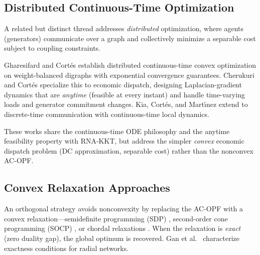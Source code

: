 \documentclass[11pt,onecolumn]{article}
\theoremstyle{definition}
\theoremstyle{remark}
\begin{document}

\subsection{Distributed Continuous-Time Optimization}

A related but distinct thread addresses \emph{distributed} optimization, where agents (generators) communicate over a graph and collectively minimize a separable cost subject to coupling constraints.

Gharesifard and Cort\'{e}s \cite{gharesifard2014} establish distributed continuous-time convex optimization on weight-balanced digraphs with exponential convergence guarantees. Cherukuri and Cort\'{e}s \cite{cherukuri2015,cherukuri2016} specialize this to economic dispatch, designing Laplacian-gradient dynamics that are \emph{anytime} (feasible at every instant) and handle time-varying loads and generator commitment changes. Kia, Cort\'{e}s, and Mart\'{\i}nez \cite{kia2015} extend to discrete-time communication with continuous-time local dynamics.

These works share the continuous-time ODE philosophy and the anytime feasibility property with RNA-KKT, but address the simpler \emph{convex} economic dispatch problem (DC approximation, separable cost) rather than the nonconvex AC-OPF.

\subsection{Convex Relaxation Approaches}

An orthogonal strategy avoids nonconvexity by replacing the AC-OPF with a convex relaxation---semidefinite programming (SDP) \cite{lavaei2012,molzahn2013}, second-order cone programming (SOCP) \cite{kocuk2016}, or chordal relaxations \cite{low2014a,low2014b}. When the relaxation is \emph{exact} (zero duality gap), the global optimum is recovered. Gan et al.\ \cite{gan2015} characterize exactness conditions for radial networks.
\end{document}
